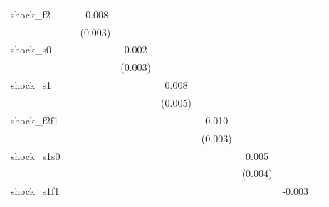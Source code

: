 {\begin{tabular}{l*{8}{c}}
\addlinespace
shock\_f2    &                     &      -0.008\sym{***}&                     &                     &                     &                     &                     &                     \\
            &                     &     (0.003)         &                     &                     &                     &                     &                     &                     \\
\addlinespace
shock\_s0    &                     &                     &       0.002         &                     &                     &                     &                     &                     \\
            &                     &                     &     (0.003)         &                     &                     &                     &                     &                     \\
\addlinespace
shock\_s1    &                     &                     &                     &       0.008         &                     &                     &                     &                     \\
            &                     &                     &                     &     (0.005)         &                     &                     &                     &                     \\
\addlinespace
shock\_f2f1  &                     &                     &                     &                     &       0.010\sym{***}&                     &                     &                     \\
            &                     &                     &                     &                     &     (0.003)         &                     &                     &                     \\
\addlinespace
shock\_s1s0  &                     &                     &                     &                     &                     &       0.005         &                     &                     \\
            &                     &                     &                     &                     &                     &     (0.004)         &                     &                     \\
\addlinespace
shock\_s1f1  &                     &                     &                     &                     &                     &                     &      -0.003         &                     \\

\end{tabular}}
